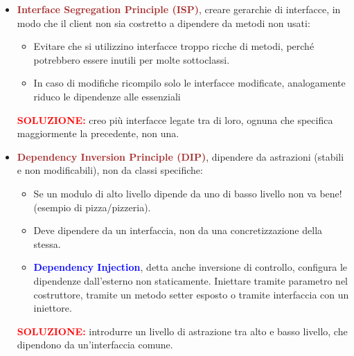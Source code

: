 \begin{itemize}
    \begin{itemize}
        \item La validità di un modello dipende dall'utilizzatore, dato che il focus è il comportamento pubblico della classe OOP.
    \end{itemize}
    \textbf{\textcolor{red}{SOLUZIONE:}} delegare i metodi alle sottoclassi che ereditano da quella base che contiene le firme delle funzioni.
    \item \textbf{\textcolor{brown}{Interface Segregation Principle (ISP)}}, creare gerarchie di interfacce, in modo che il client non sia costretto a dipendere da metodi non usati:
    \begin{itemize}
        \item Evitare che si utilizzino interfacce troppo ricche di metodi, perché potrebbero essere inutili per molte sottoclassi.
        \item In caso di modifiche ricompilo solo le interfacce modificate, analogamente riduco le dipendenze alle essenziali
    \end{itemize}
    \textbf{\textcolor{red}{SOLUZIONE:}} creo più interfacce legate tra di loro, ognuna che specifica maggiormente la precedente, non una.
    \item \textbf{\textcolor{brown}{Dependency Inversion Principle (DIP)}}, dipendere da astrazioni (stabili e non modificabili), non da classi specifiche:
    \begin{itemize}
        \item Se un modulo di alto livello dipende da uno di basso livello non va bene! (esempio di pizza/pizzeria).
        \item Deve dipendere da un interfaccia, non da una concretizzazione della stessa.
        \item \textbf{\textcolor{blue}{Dependency Injection}}, detta anche inversione di controllo, configura le dipendenze dall'esterno non staticamente. Iniettare tramite parametro nel costruttore, tramite un metodo setter esposto o tramite interfaccia con un iniettore.
    \end{itemize}
     \textbf{\textcolor{red}{SOLUZIONE:}} introdurre un livello di astrazione tra alto e basso livello, che dipendono da un'interfaccia comune.
\end{itemize}

